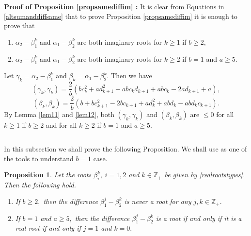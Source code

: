 \documentclass[12pt,reqno]{amsart}
\theoremstyle{plain}
\newtheorem{prop}{Proposition}
\theoremstyle{definition}
\theoremstyle{remark}
\newcommand\bz{\mathbb Z}
\begin{document}
\medskip

\textbf{Proof of Proposition \ref{propsamediffim} :}
It is clear from Equations in \ref{altsumanddiffsame} that to prove Proposition \ref{propsamediffim} it is enough to prove that
\begin{enumerate}
    \item $\alpha_2-\beta_{1}^{k}$ and $\alpha_1-\beta_{2}^{k}$ are both imaginary roots for $k\geq 1$ if $b\geq 2,$
    \item $\alpha_2-\beta_{1}^{k}$ and $\alpha_1-\beta_{2}^{k}$ are both imaginary roots for $k\geq 2$ if $b=1$ and $a\geq 5.$
\end{enumerate} 
Let $\gamma_k=\alpha_2-\beta_{1}^{k}$ and $\beta_k=\alpha_1-\beta_2^k.$ Then we have 
$$(\gamma_k,\gamma_k)=\frac{2}{b}\left(bc_k^2+ad_{k+1}^2-abc_kd_{k+1}+abc_{k}-2ad_{k+1}+a\right),$$
$$(\beta_k,\beta_k)=\frac{2}{b}( b+bc_{k+1}^2-2bc_{k+1}+ad_k^2+abd_k-abd_kc_{k+1}).$$ By Lemma \ref{lem11} and \ref{lem12}, both $(\gamma_k,\gamma_k)$ and $(\beta_k,\beta_k)$ are $\le 0$ for all $k\geq 1$ if $b\geq 2$ and for all $k\geq 2$ if $b=1$ and $a\geq 5.$





\subsection{} In this subsection we shall prove the following Proposition. We shall use \cite[Theorem 3.6]{carbone2021commutator} as one of the tools to understand $b=1$ case. 

\begin{prop}\label{propdiffnot}
     Let the roots $\beta_{i}^{k},\ i=1,2$ and $k\in \bz_+$ be given by \ref{realrootstypes}.
    Then the following hold.
    \begin{enumerate}
        \item If $b\geq 2,$ then the difference $\beta_{1}^{j}-\beta_{2}^{k}$ is never a root for any $j,k\in\bz_+.$
        \item If $b=1$ and $a\geq 5,$ then the difference $\beta_{1}^{j}-\beta_{2}^{k}$ is a root if and only if it is a real root if and only if $j=1$ and $k=0.$
    \end{enumerate}
\end{prop}
\end{document}
